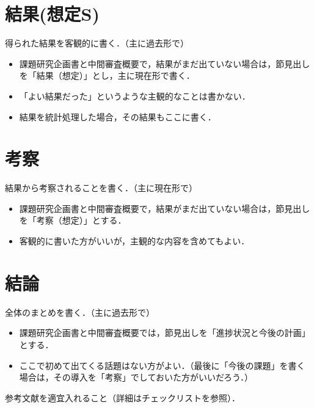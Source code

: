 \documentclass[uplatex,twocolumn,dvipdfmx,10pt]{jsarticle}
\begin{document}
\section{結果(想定S)}


得られた結果を客観的に書く．（主に過去形で）

\begin{itemize}
\item 課題研究企画書と中間審査概要で，結果がまだ出ていない場合は，節見出しを「結果（想定）」とし，主に現在形で書く．
\item 「よい結果だった」というような主観的なことは書かない．
\item 結果を統計処理した場合，その結果もここに書く．
\end{itemize}



\section{考察}

結果から考察されることを書く．（主に現在形で）

\begin{itemize}
\item 課題研究企画書と中間審査概要で，結果がまだ出ていない場合は，節見出しを「考察（想定）」とする．
\item 客観的に書いた方がいいが，主観的な内容を含めてもよい．
\end{itemize}



\section{結論}

全体のまとめを書く．（主に過去形で）

\begin{itemize}
\item 課題研究企画書と中間審査概要では，節見出しを「進捗状況と今後の計画」とする．
\item ここで初めて出てくる話題はない方がよい．（最後に「今後の課題」を書く場合は，その導入を「考察」でしておいた方がいいだろう．）
\end{itemize}


参考文献を適宜入れること（詳細はチェックリストを参照）\cite{weko_187907_1}．



\end{document}
